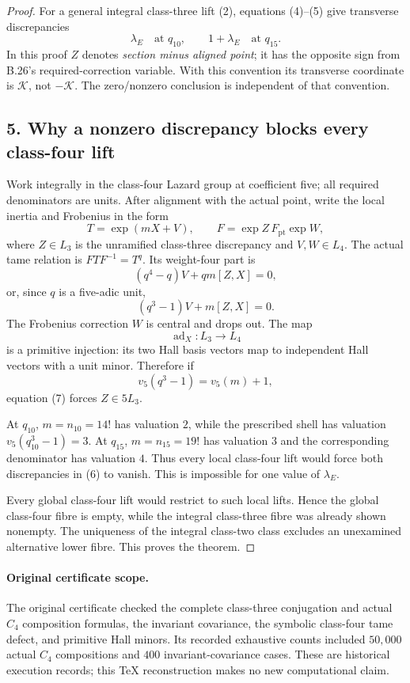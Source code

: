 \begin{proof}
For a general integral class-three lift (2), equations (4)--(5) give transverse discrepancies
\[
 \lambda_E\quad\text{at }q_{10},\qquad
 1+\lambda_E\quad\text{at }q_{15}.
 \tag{6}
\]
In this proof $Z$ denotes \emph{section minus aligned point}; it has the opposite sign from B.26's required-correction variable. With this convention its transverse coordinate is $\mathcal K$, not $-\mathcal K$. The zero/nonzero conclusion is independent of that convention.

\subsection*{5. Why a nonzero discrepancy blocks every class-four lift}
Work integrally in the class-four Lazard group at coefficient five; all required denominators are units. After alignment with the actual point, write the local inertia and Frobenius in the form
\[
 T=\exp(mX+V),\qquad
 F=\exp Z\,F_{\mathrm{pt}}\exp W,
\]
where $Z\in L_3$ is the unramified class-three discrepancy and $V,W\in L_4$. The actual tame relation is $FTF^{-1}=T^q$. Its weight-four part is
\[
 (q^4-q)V+qm[Z,X]=0,
\]
or, since $q$ is a five-adic unit,
\[
 (q^3-1)V+m[Z,X]=0.
 \tag{7}
\]
The Frobenius correction $W$ is central and drops out. The map
\[
 \operatorname{ad}_X:L_3\longrightarrow L_4
\]
is a primitive injection: its two Hall basis vectors map to independent Hall vectors with a unit minor. Therefore if
\[
 v_5(q^3-1)=v_5(m)+1,
\]
equation (7) forces $Z\in5L_3$.

At $q_{10}$, $m=n_{10}=14!$ has valuation $2$, while the prescribed shell has valuation $v_5(q_{10}^3-1)=3$. At $q_{15}$, $m=n_{15}=19!$ has valuation $3$ and the corresponding denominator has valuation $4$. Thus every local class-four lift would force both discrepancies in (6) to vanish. This is impossible for one value of $\lambda_E$.

Every global class-four lift would restrict to such local lifts. Hence the global class-four fibre is empty, while the integral class-three fibre was already shown nonempty. The uniqueness of the integral class-two class excludes an unexamined alternative lower fibre. This proves the theorem.
\end{proof}

\paragraph{Original certificate scope.}
The original certificate checked the complete class-three conjugation and actual $C_4$ composition formulas, the invariant covariance, the symbolic class-four tame defect, and primitive Hall minors. Its recorded exhaustive counts included $50{,}000$ actual $C_4$ compositions and $400$ invariant-covariance cases. These are historical execution records; this TeX reconstruction makes no new computational claim.
